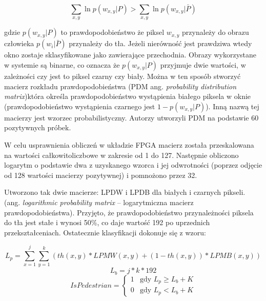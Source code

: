 \begin{equation} \label{eq:bayes_china}
\sum_{x,y} \ln p(w_{x,y}|P) > \sum_{x,y} \ln p(w_{x,y}|\bar{P})
\end{equation}

\noindent gdzie \( p(w_{x,y}|P) \) to prawdopodobieństwo że piksel $w_{x,y}$ przynależy do obrazu człowieka
\( p(w_i|\bar{P}) \) przynależy do tła.
Jeżeli nierówność jest prawdziwa wtedy okno zostaje sklasyfikowane jako zawierające przechodnia.
Obrazy wykorzystane w systemie są binarne, co oznacza że \( p(w_{x,y}|P) \) przyjmuje dwie wartości, w zależności czy jest to piksel czarny czy biały. Można w ten sposób stworzyć macierz rozkładu prawdopodobieństwa (PDM ang. \textit{probability distribution matrix})która określa prawdopodobieństwo wystąpienia białego piksela w oknie (prawdopodobieństwo wystąpienia czarnego jest \(1-  p(w_{x,y}|P) \)). Inną nazwą tej macierzy jest wzorzec probabilistyczny.
Autorzy utworzyli PDM na podstawie 60 pozytywnych próbek. 

W celu usprawnienia obliczeń w układzie FPGA macierz została przeskalowana na wartości całkowitoliczbowe w zakresie od 1 do 127. 
Następnie obliczono logarytm o podstawie dwa z uzyskanego wzorca i jej odwrotności (poprzez odjęcie od 128 wartości macierzy pozytywnej) i pomnożono przez 32. 


Utworzono tak dwie macierze: LPDW i LPDB dla białych i czarnych pikseli. (ang. \textit{logarithmic probability matrix} – logarytmiczna macierz prawdopodobieństwa). 
Przyjęto, że prawdopodobieństwo przynależności piksela do tła jest stałe i wynosi 50\%, co daje wartość 192 po uprzednich przekształceniach. 
Ostatecznie klasyfikacji dokonuje się z wzoru: 

\begin{equation}\label{equ:Lp}
L_{p} = \sum_{x=1}^{j}\sum_{y=1}^{k}(th(x,y)*LPMW(x,y)+(1-th(x,y))*LPMB(x,y))
\end{equation}
\begin{equation}\label{equ:Lb}
L_{b} = j*k*192
\end{equation}
\begin{equation} \label{equ:ispedistant}
IsPedestrian = \left\{ \begin{array}{ll}
1 & \textrm{gdy $L_{p} \geq L_{b} + K$}\\
0 & \textrm{gdy $L_{p}<L_{b} + K$}
\end{array} \right.
\end{equation}


